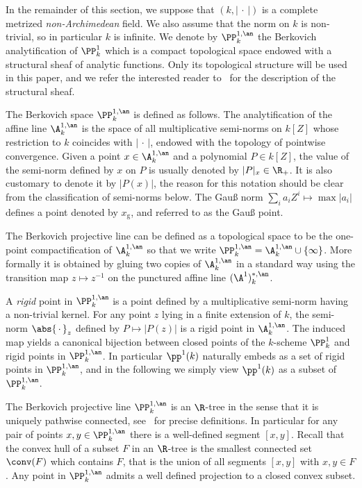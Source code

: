 In the remainder of this section, we suppose that $(k,|{\,\cdot\,}|)$ is a complete metrized \emph{non-Archimedean} field. We also assume that the norm on $k$ is non-trivial, so in particular $k$ is infinite. We denote by $\PP^{1,\an}_k$ the Berkovich analytification of $\PP^1_k$ which is a compact topological space endowed with a structural sheaf of analytic functions. Only its topological structure will be used in this paper, and we refer the interested reader to~\cite{berko} for the description of the structural sheaf.

The Berkovich space $\PP^{1,\an}_k$ is defined as follows. The analytification of the affine line $\A^{1,\an}_k$ is the space of all multiplicative semi-norms on $k[Z]$ whose restriction to $k$ coincides with $|{\,\cdot\,}|$, endowed with the topology of pointwise convergence. Given a point $x\in \A^{1,\an}_k$ and a polynomial $P\in k[Z]$, the value of the semi-norm defined by $x$ on $P$ is usually denoted by $\mathopen{|}P\mathclose{|}_x \in \R_+$. It is also customary to denote it by $|P(x)|$, the reason for this notation should be clear from the classification of semi-norms below. The Gau{\ss} norm $\sum_i a_i Z^i \mapsto \max |a_i|$ defines a point denoted by $x_{\mathrm{g}}$, and referred to as the Gau{\ss} point.

The Berkovich projective line can be defined as a topological space to be the one-point compactification of $\A^{1,\an}_k$ so that we write $\PP^{1,\an}_k = \A^{1,\an}_k \cup \{\infty\}$. More formally it is obtained by gluing two copies of $\A^{1,\an}_k$ in a standard way using the transition map $z\mapsto z^{-1}$ on the punctured affine line $(\A^1)^{*,\an}_k$.

A \emph{rigid} point in $\PP^{1,\an}_k$ is a point defined by a multiplicative semi-norm having a non-trivial kernel. For any point $z$ lying in a finite extension of $k$, the semi-norm $\abs{{\,\cdot\,}}_z$ defined by $P \mapsto |P(z)|$ is a rigid point in $\A^{1,\an}_k$. The induced map yields a canonical bijection between closed points of the $k$-scheme $\PP^1_k$ and rigid points in $\PP^{1,\an}_k$. In particular $\pp^1(k)$ naturally embeds as a set of rigid points in $\PP^{1,\an}_k$, and in the following we simply view $\pp^1(k)$ as a subset of $\PP^{1,\an}_k$.

The Berkovich projective line $\PP^{1,\an}_k$ is an $\R$-tree in the sense that it is uniquely pathwise connected, see~\cite[\S 2]{jonsson} for precise definitions. In particular for any pair of points $x,y\in \PP^{1,\an}_k$ there is a well-defined segment $[x,y]$. Recall that the convex hull of a subset $F$ in an $\R$-tree is the smallest connected set $\conv (F)$ which contains $F$, that is the union of all segments $[x,y]$ with $x, y \in F$. Any point in $\PP^{1,\an}_k$ admits a well defined projection to a closed convex subset.

